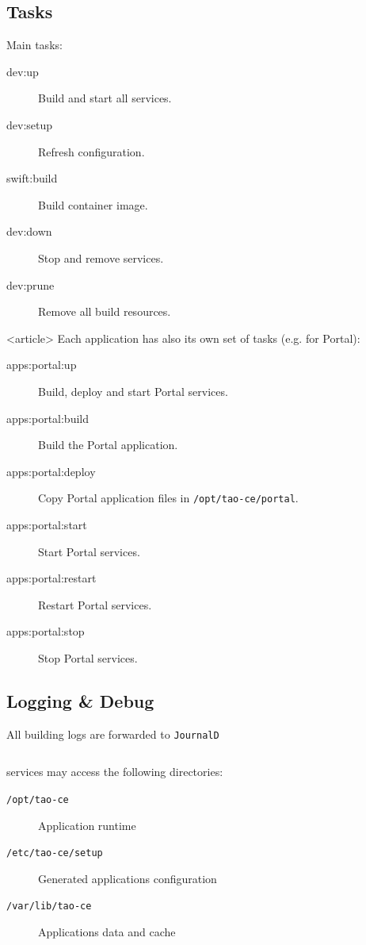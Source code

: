 \subsection{Tasks}
\begin{frame}
    Main tasks:
    \begin{description}
        \item[dev:up] Build and start all \taoce services.
        \item[dev:setup] Refresh \taoce \devcontainer configuration.
        \item[swift:build] Build \taoce container image.
        \item[dev:down] Stop and remove \taoce services.
        \item[dev:prune] Remove all build resources.
    \end{description}

\end{frame}

\begin{frame}<article>
    Each application has also its own set of tasks (e.g. for Portal):
    \begin{description}
        \item[apps:portal:up] Build, deploy and start Portal services.
        \item[apps:portal:build] Build the Portal application.
        \item[apps:portal:deploy] Copy Portal application files in \texttt{/opt/tao-ce/portal}.
        \item[apps:portal:start] Start Portal services.
        \item[apps:portal:restart] Restart Portal services.
        \item[apps:portal:stop] Stop Portal services.
    \end{description}
\end{frame}

\subsection{Logging \& Debug}
\begin{frame}[fragile=singleslide]
All building logs are forwarded to \texttt{JournalD}
\inputminted{bash}{./snippets/journalctl.sh}

\TAOCE services may access the following directories:
\begin{description}
    \item[\texttt{/opt/tao-ce}] Application runtime
    \item[\texttt{/etc/tao-ce/setup}] Generated applications configuration
    \item[\texttt{/var/lib/tao-ce}] Applications data and cache
\end{description}
\end{frame}